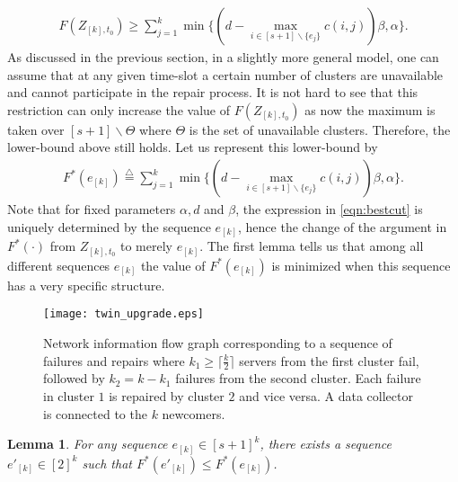 \documentclass[journal,onecolumn,draftcls]{IEEEtran}
\newtheorem{lemma}{Lemma}
\begin{document}
\begin{eqnarray*}
F(Z_{[k],t_0})\ge \sum_{j = 1}^k \min\{(d - \max_{i\in[s+1]\backslash \{e_j\}} c(i,j))\beta,\alpha\}.
\end{eqnarray*}
As discussed in the previous section, in a slightly more general model, one can assume that at any given time-slot a certain number of clusters are unavailable and cannot participate in the repair process. It is not hard to see that this restriction can only increase the value of $F(Z_{[k],t_0})$ as now the maximum is taken over $[s+1]\backslash \Theta$ where $\Theta$ is the set of unavailable clusters. Therefore, the lower-bound above still holds. Let us represent this lower-bound by
\begin{eqnarray}
F^*(e_{[k]}) \stackrel{\triangle}{=} \sum_{j = 1}^k \min\{(d - \max_{i\in[s+1]\backslash \{e_j\}} c(i,j))\beta,\alpha\}.
\label{eqn:bestcut}
\end{eqnarray}
Note that for fixed parameters $\alpha,d$ and $\beta$, the expression in \eqref{eqn:bestcut} is uniquely determined by the sequence $e_{[k]}$, hence the change of the argument in $F^*(\cdot)$ from $Z_{[k],t_0}$ to merely $e_{[k]}$. The first lemma tells us that among all different sequences $e_{[k]}$  the value of $F^*(e_{[k]})$ is minimized when this sequence has a very specific structure.


\begin{figure}[H]
\centering
\texttt{[image: twin\_upgrade.eps]}
\caption{Network information flow graph corresponding to a sequence of failures and repairs where $k_1\ge \lceil\frac{k}{2}\rceil$ servers from the first cluster fail, followed by $k_2 = k -k_1$ failures from the second cluster. Each failure in cluster $1$ is repaired by cluster $2$ and vice versa. A data collector is connected to the $k$ newcomers.}
\label{fig:twin}
\end{figure}


\begin{lemma}
For any sequence $e_{[k]}\in [s+1]^k$, there exists a sequence $e'_{[k]}\in [2]^k$ such that $F^*(e'_{[k]})\le F^*(e_{[k]})$.
\end{lemma}
\end{document}
